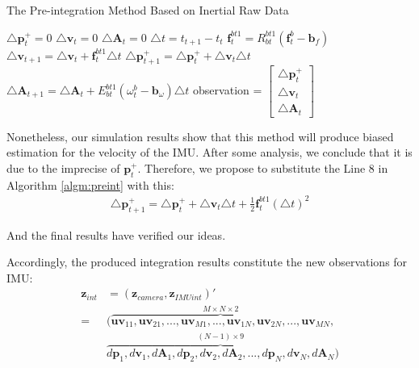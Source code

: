 \documentclass[12pt]{article}   %
\begin{document}
\begin{algorithm}
\caption{The Pre-integration Method Based on Inertial Raw Data}
\label{algm:preint}
\begin{algorithmic}[8]
\STATE $\triangle \textbf{p}^+_t = 0$ 
\STATE $\triangle \textbf{v}_t = 0$ 
\STATE $\triangle \textbf{A}_t = 0$ 
\STATE $\triangle t =  t_{t+1} - t_t$ 
\STATE $\textbf{f}_t^{bt1} = R_{bt}^{bt1} (\textbf{f}_t^b - \textbf{b}_f)$ 
\STATE $\triangle \textbf{v}_{t+1} = \triangle \textbf{v}_{t} + \textbf{f}_t^{bt1} \triangle t$ 
\STATE $\triangle \textbf{p}_{t+1}^+ = \triangle \textbf{p}_{t}^+ + \triangle \textbf{v}_t \triangle t$ 
\STATE $\triangle \textbf{A} _{t+1} = \triangle \textbf{A} _{t} + E_{bt}^{bt1} (\omega _t^b - \textbf{b}_\omega) \triangle t$ 
\ENDFOR
\STATE observation = $\begin{bmatrix} \triangle \textbf{p}_{t}^+ \\ \triangle \textbf{v}_{t} \\ \triangle \textbf{A} _{t} \end{bmatrix}$
\end{algorithmic}
\end{algorithm}

Nonetheless, our simulation results show that this method will produce biased estimation for the velocity of the IMU. After some analysis, we conclude that it is due to the imprecise of $\textbf{p}_{t}^+$. Therefore, we propose to substitute the Line 8 in Algorithm \ref{algm:preint} with this: 
\begin{align*}
\triangle \textbf{p}_{t+1}^+ = \triangle \textbf{p}_{t}^+ + \triangle \textbf{v}_t \triangle t + \frac{1}{2} \textbf{f}_t^{bt1} {(\triangle t)}^2 
\end{align*}

And the final results have verified our ideas.

Accordingly, the produced integration results constitute the new observations for IMU:
\begin{align}
\textbf{z}_{int} &= (\textbf{z}_{camera}, \textbf{z}_{IMUint})' \nonumber \\
	=& (\overbrace{\textbf{uv}_{11}, \textbf{uv}_{21}, ... , \textbf{uv}_{M1}, ..., \textbf{uv}_{1N}, \textbf{uv}_{2N}, ... , \textbf{uv}_{MN}}^{M \times N \times 2}, \nonumber \\ 
	& \overbrace{d\textbf{p}_{1}, d\textbf{v}_{1}, d\textbf{A}_{1}, d\textbf{p}_{2}, d\textbf{v}_{2}, d\textbf{A}_{2}, ... , d\textbf{p}_{N}, d\textbf{v}_{N}, d\textbf{A}_{N}}^{(N-1) \times 9}) 
\end{align}
\end{document}

